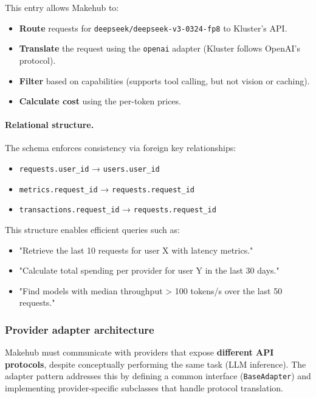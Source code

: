 \documentclass[english]{article}
\begin{document}
This entry allows Makehub to:
\begin{itemize}
    \item \textbf{Route} requests for \texttt{deepseek/deepseek-v3-0324-fp8} to Kluster's API.
    \item \textbf{Translate} the request using the \texttt{openai} adapter (Kluster follows OpenAI's protocol).
    \item \textbf{Filter} based on capabilities (supports tool calling, but not vision or caching).
    \item \textbf{Calculate cost} using the per-token prices.
\end{itemize}

\paragraph{Relational structure.}

The schema enforces consistency via foreign key relationships:
\begin{itemize}
    \item \texttt{requests.user\_id} → \texttt{users.user\_id}
    \item \texttt{metrics.request\_id} → \texttt{requests.request\_id}
    \item \texttt{transactions.request\_id} → \texttt{requests.request\_id}
\end{itemize}

This structure enables efficient queries such as:
\begin{itemize}
    \item "Retrieve the last 10 requests for user X with latency metrics."
    \item "Calculate total spending per provider for user Y in the last 30 days."
    \item "Find models with median throughput > 100 tokens/s over the last 50 requests."
\end{itemize}


\subsubsection{Provider adapter architecture}

Makehub must communicate with providers that expose \textbf{different API protocols}, despite conceptually performing the same task (LLM inference). The adapter pattern addresses this by defining a common interface (\texttt{BaseAdapter}) and implementing provider-specific subclasses that handle protocol translation.
\end{document}

